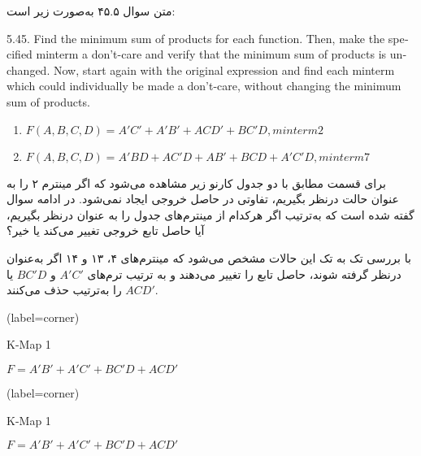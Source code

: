 متن سوال ۴۵.۵ به‌صورت زیر است:

\begin{latin}
	5.45. Find the minimum sum of products for each function. Then, make the specified
	minterm a don’t-care and verify that the minimum sum of products is unchanged.
	Now, start again with the original expression and find each minterm which
	could individually be made a don’t-care, without changing the minimum sum of
	products.
	
	\begin{enumerate}
		\item 
		$F(A, B, C, D) = A'C' + A'B' + ACD' + BC'D, minterm 2$
		
		\item 
		$F(A, B, C, D) = A'BD + AC'D + AB' + BCD + A'C'D, minterm 7$
	\end{enumerate}
\end{latin}


برای قسمت  مطابق با دو جدول کارنو زیر مشاهده می‌شود که اگر مینترم ۲ را به عنوان حالت  درنظر بگیریم، تفاوتی در حاصل خروجی ایجاد نمی‌شود. در ادامه سوال گفته شده است که به‌ترتیب اگر هرکدام از مینترم‌های جدول را به عنوان  درنظر بگیریم، آیا حاصل تابع خروجی تغییر می‌کند یا خیر؟

با بررسی تک به تک این حالات مشخص می‌شود که مینترم‌های ۴، ۱۳ و ۱۴ اگر به‌عنوان  درنظر گرفته شوند، حاصل تابع را تغییر می‌دهند و به ترتیب ترم‌های $A'C'$ و $BC'D$ یا $ACD'$ را به‌ترتیب حذف می‌کنند.

\begin{latin}
	\begin{minipage}{0.48\textwidth}
		\centering
		\begin{karnaugh-map}[4][4][1][$B$][$A$][$C$][$D$](label=corner)
		\end{karnaugh-map}
		\caption{K-Map 1}
		$F=A'B'+A'C'+BC'D+ACD'$
	\end{minipage}
	\hfill
	\begin{minipage}{0.48\textwidth}
		\centering
		\begin{karnaugh-map}[4][4][1][$B$][$A$][$D$][$C$](label=corner)
		\end{karnaugh-map}
		\caption{K-Map 1}
		$F=A'B'+A'C'+BC'D+ACD'$
	\end{minipage}	
\end{latin}



